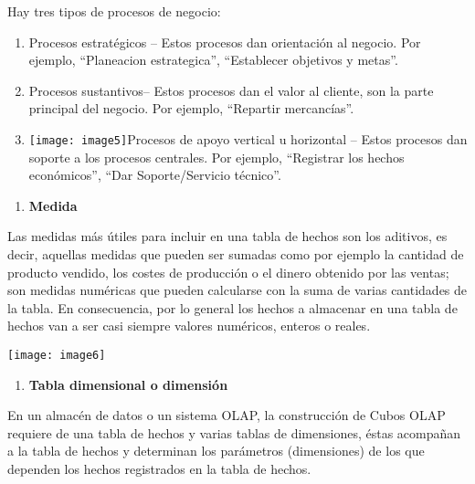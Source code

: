 \documentclass{article} %
\begin{document}
\noindent 

\noindent Hay tres tipos de procesos de negocio:

\noindent 

\begin{enumerate}
\item  Procesos estrat\'{e}gicos -- Estos procesos dan orientaci\'{o}n al negocio. Por ejemplo, ``Planeacion estrategica'', ``Establecer objetivos y metas''.

\item  Procesos sustantivos-- Estos procesos dan el valor al cliente, son la parte principal del negocio. Por ejemplo, ``Repartir mercanc\'{i}as''.

\item  \texttt{[image: image5]}Procesos de apoyo vertical u horizontal -- Estos procesos dan soporte a los procesos centrales. Por ejemplo, ``Registrar los hechos econ\'{o}micos'', ``Dar Soporte/Servicio t\'{e}cnico''.
\end{enumerate}

\noindent 

\begin{enumerate}
\item  \textbf{Medida}
\end{enumerate}

\noindent \textbf{}

\noindent Las medidas m\'{a}s \'{u}tiles para incluir en una tabla de hechos son los aditivos, es decir, aquellas medidas que pueden ser sumadas como por ejemplo la cantidad de producto vendido, los costes de producci\'{o}n o el dinero obtenido por las ventas; son medidas num\'{e}ricas que pueden calcularse con la suma de varias cantidades de la tabla. En consecuencia, por lo general los hechos a almacenar en una tabla de hechos van a ser casi siempre valores num\'{e}ricos, enteros o reales.

\noindent \texttt{[image: image6]}

\begin{enumerate}
\item  \textbf{Tabla dimensional o dimensi\'{o}n}
\end{enumerate}

\noindent 

\noindent En un almac\'{e}n de datos o un sistema OLAP, la construcci\'{o}n de Cubos OLAP requiere de una tabla de hechos y varias tablas de dimensiones, \'{e}stas acompa\~{n}an a la tabla de hechos y determinan los par\'{a}metros (dimensiones) de los que dependen los hechos registrados en la tabla de hechos.
\end{document}
